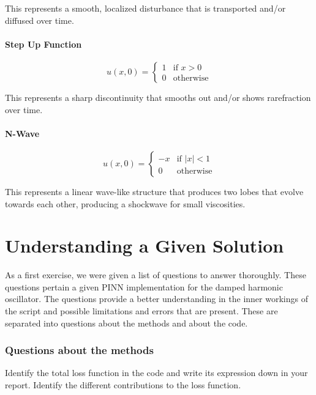 \documentclass[12pt, a4paper]{report}
\begin{document}
This represents a smooth, localized disturbance that is transported and/or diffused over time.

\subsubsection{Step Up Function}
\begin{equation}
u(x, 0) = \begin{cases} 1 & \text{if } x > 0 \\ 0 & \text{otherwise} \end{cases}
\end{equation}

This represents a sharp discontinuity that smooths out and/or shows rarefraction over time.
\subsubsection{N-Wave}
\begin{equation}
u(x, 0) = \begin{cases} -x & \text{if } |x| < 1 \\ 0 & \text{otherwise} \end{cases}
\end{equation}

This represents a linear wave-like structure that produces two lobes that evolve towards each other, producing a shockwave for small viscosities.

\chapter{Understanding a Given Solution}
As a first exercise, we were given a list of questions to answer thoroughly. These questions pertain a given PINN implementation for the damped harmonic oscillator. The questions provide a better understanding in the inner workings of the script and possible limitations and errors that are present. These are separated into questions about the methods and about the code.\\

\subsection*{Questions about the methods}

\begin{tcolorbox}[title=Methods Question 1,sharp corners, colframe=black, colback=white]
    Identify the total loss function in the code and write its expression down in your report. Identify the different contributions to the loss function.
\end{tcolorbox}
\end{document}
